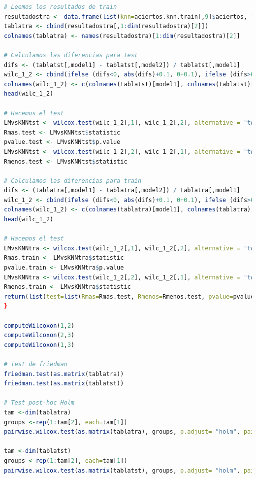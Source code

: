 \documentclass[12pt,a4paper]{article}
\begin{document}
\begin{lstlisting}[basicstyle=\tiny, language=R]
# Leemos los resultados de train
resultadostra <- data.frame(list(knn=aciertos.knn.train[,9]$aciertos, lda=aciertos.lda.train, qda=aciertos.qda.train))
tablatra <- cbind(resultadostra[,1:dim(resultadostra)[2]])
colnames(tablatra) <- names(resultadostra)[1:dim(resultadostra)[2]]

# Calculamos las diferencias para test
difs <- (tablatst[,model1] - tablatst[,model2]) / tablatst[,model1]
wilc_1_2 <- cbind(ifelse (difs<0, abs(difs)+0.1, 0+0.1), ifelse (difs>0, abs(difs)+0.1, 0+0.1))
colnames(wilc_1_2) <- c(colnames(tablatst)[model1], colnames(tablatst)[model2])
head(wilc_1_2)

# Hacemos el test
LMvsKNNtst <- wilcox.test(wilc_1_2[,1], wilc_1_2[,2], alternative = "two.sided", paired=TRUE)
Rmas.test <- LMvsKNNtst$statistic
pvalue.test <- LMvsKNNtst$p.value
LMvsKNNtst <- wilcox.test(wilc_1_2[,2], wilc_1_2[,1], alternative = "two.sided", paired=TRUE)
Rmenos.test <- LMvsKNNtst$statistic

# Calculamos las diferencias para train
difs <- (tablatra[,model1] - tablatra[,model2]) / tablatra[,model1]
wilc_1_2 <- cbind(ifelse (difs<0, abs(difs)+0.1, 0+0.1), ifelse (difs>0, abs(difs)+0.1, 0+0.1))
colnames(wilc_1_2) <- c(colnames(tablatra)[model1], colnames(tablatra)[model2])
head(wilc_1_2)

# Hacemos el test
LMvsKNNtra <- wilcox.test(wilc_1_2[,1], wilc_1_2[,2], alternative = "two.sided", paired=TRUE)
Rmas.train <- LMvsKNNtra$statistic
pvalue.train <- LMvsKNNtra$p.value
LMvsKNNtra <- wilcox.test(wilc_1_2[,2], wilc_1_2[,1], alternative = "two.sided", paired=TRUE)
Rmenos.train <- LMvsKNNtra$statistic
return(list(test=list(Rmas=Rmas.test, Rmenos=Rmenos.test, pvalue=pvalue.test), train=list(Rmas=Rmas.train, Rmenos=Rmenos.train, pvalue=pvalue.train)))
}

computeWilcoxon(1,2)
computeWilcoxon(2,3)
computeWilcoxon(1,3)

# Test de friedman
friedman.test(as.matrix(tablatra))
friedman.test(as.matrix(tablatst))

# Test post-hoc Holm
tam <-dim(tablatra)
groups <-rep(1:tam[2], each=tam[1])
pairwise.wilcox.test(as.matrix(tablatra), groups, p.adjust= "holm", paired = T)

tam <-dim(tablatst)
groups <-rep(1:tam[2], each=tam[1])
pairwise.wilcox.test(as.matrix(tablatst), groups, p.adjust= "holm", paired = T)

\end{lstlisting}
\end{document}
